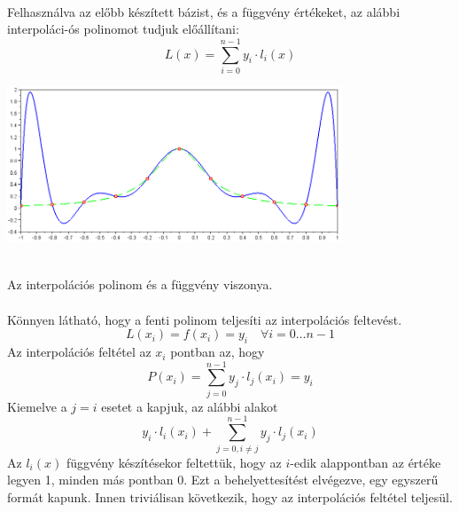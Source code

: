 \documentclass{elteikthesis}
\begin{document}
\paragraph{}
Felhasználva az előbb készített bázist, és a függvény értékeket, az alábbi interpoláci-ós polinomot tudjuk előállítani:$$L(x) = \sum_{i=0}^{n-1} y_i \cdot l_i(x)$$
\begin{center}
\includegraphics[width=10cm]{pics/polynomial_interpolation}\\
 \\
{\footnotesize Az interpolációs polinom és a függvény viszonya.}
\end{center}
\paragraph{}
Könnyen látható, hogy a fenti polinom teljesíti az interpolációs feltevést. $$L(x_i) = f(x_i) = y_i \quad \forall i = 0\dots{n-1}$$ Az interpolációs feltétel az $x_i$ pontban az, hogy $$P(x_i)=\sum_{j=0}^{n-1} y_j\cdot l_j(x_i) = y_i$$ Kiemelve a $j = i$ esetet a kapjuk, az alábbi alakot $$y_i \cdot l_i(x_i) + \sum_{j=0, i \neq j}^{n-1} y_j \cdot l_j(x_i)$$ Az $l_i(x)$ függvény készítésekor feltettük, hogy az $i$-edik alappontban az értéke legyen 1, minden más pontban 0. Ezt a behelyettesítést elvégezve, egy egyszerű formát kapunk. Innen triviálisan következik, hogy az interpolációs feltétel teljesül.
\end{document}
